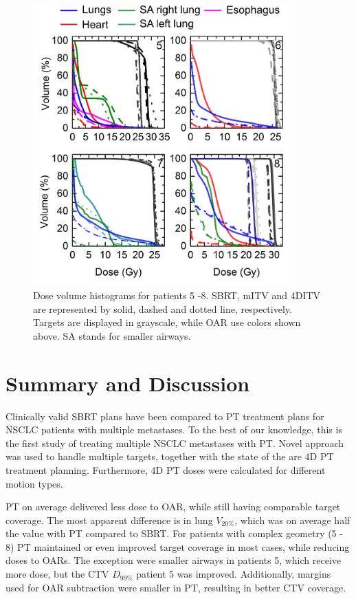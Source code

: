 \documentclass[type=dr, dr=rernat, accentcolor=tud7b,colorbacktitle, bigchapter, openright, twoside, 12pt ]{tudthesis}
\begin{document}
\newpage
\begin{figure}[H]
	\begin{center}
		\includegraphics[width=0.9\textwidth]{./Images/DVH_legend.png}
		\caption{Dose volume histograms for patients 5 -8. SBRT, mITV and 4DITV are represented by solid, dashed and dotted line, respectively. Targets are displayed
		in grayscale, while OAR use colors shown above. SA stands for smaller airways.}
		\label{Fig:dvh}
	\end{center}
\end{figure}
\newpage


\section{Summary and Discussion}

Clinically valid SBRT plans have been compared to PT treatment plans for NSCLC patients with multiple metastases. 
To the best of our knowledge, this is the first study of treating multiple NSCLC metastases with PT. Novel approach was used to handle multiple targets, together
with the state of the are 4D PT treatment planning. Furthermore, 4D PT doses were calculated for different motion types. 

PT on average delivered less dose to OAR, while still having comparable target coverage.
The most apparent difference is in lung $V_{20\%}$, which was on average half the value with PT compared to SBRT.
For patients with complex geometry (5 - 8) PT maintained or even improved target coverage in most cases, while reducing doses to OARs.
The exception were smaller airways in patients 5, which receive more dose, but the CTV $D_{99\%}$ patient 5 was improved. 
Additionally, margins used for OAR subtraction were smaller in PT, resulting in better CTV coverage.
\end{document}
